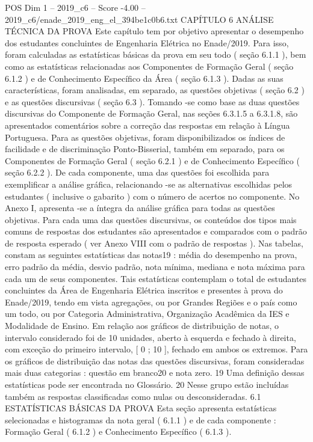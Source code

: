 \begin{textsample}{POS Dim 1 – 2019\_c6 – Score -4.00 – 2019\_c6/enade\_2019\_eng\_el\_394be1c0b6.txt}  \label{ex:f1_pos_360}
CAPÍTULO 6 ANÁLISE TÉCNICA DA PROVA Este capítulo tem por objetivo apresentar o desempenho dos estudantes concluintes de Engenharia Elétrica no Enade/2019.
Para isso, foram calculadas as estatísticas básicas da prova em seu todo ( seção 6.1.1 ), bem como as estatísticas relacionadas aos Componentes de Formação Geral ( seção 6.1.2 ) e de Conhecimento Específico da Área ( seção 6.1.3 ).
Dadas as suas características, foram analisadas, em separado, as questões objetivas ( seção 6.2 ) e as questões discursivas ( seção 6.3 ).
Tomando -se como base as duas questões discursivas do Componente de Formação Geral, nas seções 6.3.1.5 a 6.3.1.8, são apresentados comentários sobre a correção das respostas em relação à Língua Portuguesa.
Para as questões objetivas, foram disponibilizados os índices de facilidade e de discriminação Ponto-Bisserial, também em separado, para os Componentes de Formação Geral ( seção 6.2.1 ) e de Conhecimento Específico ( seção 6.2.2 ).
De cada componente, uma das questões foi escolhida para exemplificar a análise gráfica, relacionando -se as alternativas escolhidas pelos estudantes ( inclusive o gabarito ) com o número de acertos no componente.
No Anexo I, apresenta -se a íntegra da análise gráfica para todas as questões objetivas.
Para cada uma das questões discursivas, os conteúdos dos tipos mais comuns de respostas dos estudantes são apresentados e comparados com o padrão de resposta esperado ( ver Anexo VIII com o padrão de respostas ).
Nas tabelas, constam as seguintes estatísticas das notas19 : média do desempenho na prova, erro padrão da média, desvio padrão, nota mínima, mediana e nota máxima para cada um de seus componentes.
Tais estatísticas contemplam o total de estudantes concluintes da Área de Engenharia Elétrica inscritos e presentes à prova do Enade/2019, tendo em vista agregações, ou por Grandes Regiões e o país como um todo, ou por Categoria Administrativa, Organização Acadêmica da IES e Modalidade de Ensino.
Em relação aos gráficos de distribuição de notas, o intervalo considerado foi de 10 unidades, aberto à esquerda e fechado à direita, com exceção do primeiro intervalo, [ 0 ; 10 ], fechado em ambos os extremos.
Para os gráficos de distribuição das notas das questões discursivas, foram consideradas mais duas categorias : questão em branco20 e nota zero. 19 Uma definição dessas estatísticas pode ser encontrada no Glossário. 20 Nesse grupo estão incluídas também as respostas classificadas como nulas ou desconsideradas. 6.1 ESTATÍSTICAS BÁSICAS DA PROVA Esta seção apresenta estatísticas selecionadas e histogramas da nota geral ( 6.1.1 ) e de cada componente : Formação Geral ( 6.1.2 ) e Conhecimento Específico ( 6.1.3 ).

\end{textsample}
